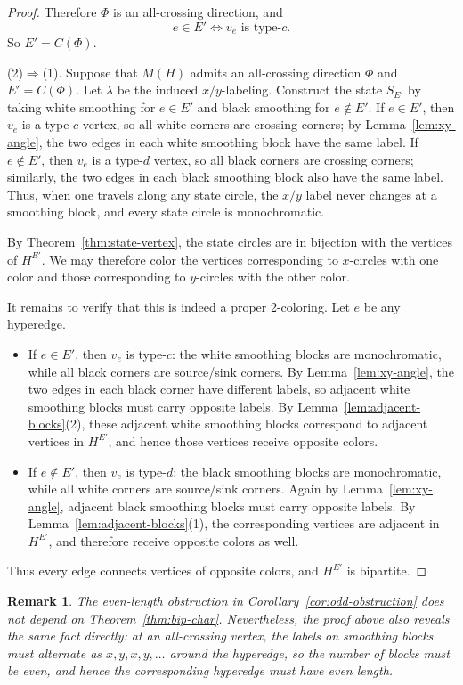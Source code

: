 \documentclass{article}
\newtheorem{remark}[theorem]{Remark}
\begin{document}
\begin{proof}
Therefore $\Phi$ is an all-crossing direction, and
\[
e\in E'\Longleftrightarrow v_e\text{ is type-}c.
\]
So $E'=C(\Phi)$.

\noindent(2)$\Rightarrow$(1). Suppose that $M(H)$ admits an all-crossing direction $\Phi$ and $E'=C(\Phi)$. Let $\lambda$ be the induced $x/y$-labeling. Construct the state $S_{E'}$ by taking white smoothing for $e\in E'$ and black smoothing for $e\notin E'$. If $e\in E'$, then $v_e$ is a type-$c$ vertex, so all white corners are crossing corners; by Lemma~\ref{lem:xy-angle}, the two edges in each white smoothing block have the same label. If $e\notin E'$, then $v_e$ is a type-$d$ vertex, so all black corners are crossing corners; similarly, the two edges in each black smoothing block also have the same label. Thus, when one travels along any state circle, the $x/y$ label never changes at a smoothing block, and every state circle is monochromatic.

By Theorem~\ref{thm:state-vertex}, the state circles are in bijection with the vertices of $H^{E'}$. We may therefore color the vertices corresponding to $x$-circles with one color and those corresponding to $y$-circles with the other color.

It remains to verify that this is indeed a proper 2-coloring. Let $e$ be any hyperedge.
\begin{itemize}
  \item If $e\in E'$, then $v_e$ is type-$c$: the white smoothing blocks are monochromatic, while all black corners are source/sink corners. By Lemma~\ref{lem:xy-angle}, the two edges in each black corner have different labels, so adjacent white smoothing blocks must carry opposite labels. By Lemma~\ref{lem:adjacent-blocks}(2), these adjacent white smoothing blocks correspond to adjacent vertices in $H^{E'}$, and hence those vertices receive opposite colors.
  \item If $e\notin E'$, then $v_e$ is type-$d$: the black smoothing blocks are monochromatic, while all white corners are source/sink corners. Again by Lemma~\ref{lem:xy-angle}, adjacent black smoothing blocks must carry opposite labels. By Lemma~\ref{lem:adjacent-blocks}(1), the corresponding vertices are adjacent in $H^{E'}$, and therefore receive opposite colors as well.
\end{itemize}
Thus every edge connects vertices of opposite colors, and $H^{E'}$ is bipartite.
\end{proof}

\begin{remark}\label{rem:odd-from-proof}
The even-length obstruction in Corollary~\ref{cor:odd-obstruction} does not depend on Theorem~\ref{thm:bip-char}. Nevertheless, the proof above also reveals the same fact directly: at an all-crossing vertex, the labels on smoothing blocks must alternate as $x,y,x,y,\dots$ around the hyperedge, so the number of blocks must be even, and hence the corresponding hyperedge must have even length.
\end{remark}
\end{document}
